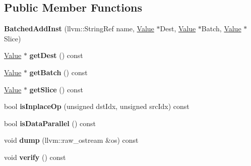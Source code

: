 \subsection*{Public Member Functions}
\begin{DoxyCompactItemize}
\item 
\mbox{\label{classglow_1_1_batched_add_inst_a8b59569c9ca46cf197d12bae57b1efae}} 
{\bfseries Batched\+Add\+Inst} (llvm\+::\+String\+Ref name, \hyperlink{classglow_1_1_value}{Value} $\ast$Dest, \hyperlink{classglow_1_1_value}{Value} $\ast$Batch, \hyperlink{classglow_1_1_value}{Value} $\ast$Slice)
\item 
\mbox{\label{classglow_1_1_batched_add_inst_a740751cab4fb8ec85575d7cb8fda990b}} 
\hyperlink{classglow_1_1_value}{Value} $\ast$ {\bfseries get\+Dest} () const
\item 
\mbox{\label{classglow_1_1_batched_add_inst_aad55300511b43d402a169eba0014cbb2}} 
\hyperlink{classglow_1_1_value}{Value} $\ast$ {\bfseries get\+Batch} () const
\item 
\mbox{\label{classglow_1_1_batched_add_inst_ab903b1a28d8de0abaa8901529c6bfe48}} 
\hyperlink{classglow_1_1_value}{Value} $\ast$ {\bfseries get\+Slice} () const
\item 
\mbox{\label{classglow_1_1_batched_add_inst_a6f2bad658ada25ff905705d3399a987c}} 
bool {\bfseries is\+Inplace\+Op} (unsigned dst\+Idx, unsigned src\+Idx) const
\item 
\mbox{\label{classglow_1_1_batched_add_inst_a6c815b804b622c995570fb635dc45a88}} 
bool {\bfseries is\+Data\+Parallel} () const
\item 
\mbox{\label{classglow_1_1_batched_add_inst_af553a851e0d0d9103d42ea491115078c}} 
void {\bfseries dump} (llvm\+::raw\+\_\+ostream \&os) const
\item 
\mbox{\label{classglow_1_1_batched_add_inst_aa805887a9cb4603a2596a633bb2c4b89}} 
void {\bfseries verify} () const
\end{DoxyCompactItemize}
